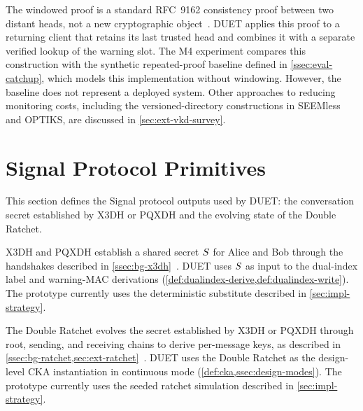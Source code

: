 \begin{remark}
The windowed proof is a standard RFC~9162 consistency proof between two distant heads, not a new
cryptographic object~\cite{rfc9162}. DUET applies this proof to a returning client
that retains its last trusted head and combines it with a separate verified lookup of the warning
slot. The M4 experiment compares this construction with the synthetic repeated-proof baseline
defined in \cref{ssec:eval-catchup}, which models this implementation without windowing. However,
the baseline does not represent a deployed system. Other approaches to reducing monitoring costs,
including the versioned-directory constructions in SEEMless and OPTIKS, are discussed in
\cref{sec:ext-vkd-survey}.
\end{remark}

\section{Signal Protocol Primitives}\label{sec:def-signal}

This section defines the Signal protocol outputs used by DUET: the conversation secret established
by X3DH or PQXDH and the evolving state of the Double Ratchet.

\begin{definition}\label{def:x3dh}
X3DH and PQXDH establish a shared secret $S$ for Alice and Bob through the handshakes
described in \cref{ssec:bg-x3dh}~\cite{x3dh,pqxdh}.
DUET uses $S$ as input to the
dual-index label and warning-MAC derivations
(\cref{def:dualindex-derive,def:dualindex-write}). The prototype currently uses the deterministic
substitute described in \cref{sec:impl-strategy}.
\end{definition}

\begin{definition}\label{def:doubleratchet}
The Double Ratchet evolves the secret established by X3DH or PQXDH through root, sending, and
receiving chains to derive per-message keys, as described in
\cref{ssec:bg-ratchet,sec:ext-ratchet}~\cite{doubleratchet}. DUET uses the Double
Ratchet as the design-level CKA instantiation in continuous mode
(\cref{def:cka,ssec:design-modes}). The prototype currently uses the seeded ratchet simulation
described in \cref{sec:impl-strategy}.
\end{definition}

